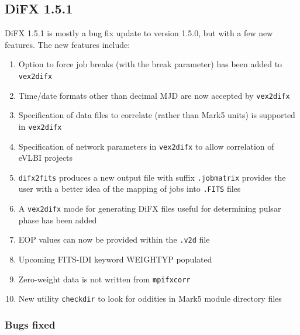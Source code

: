 \subsection{DiFX 1.5.1}

DiFX 1.5.1 is mostly a bug fix update to version 1.5.0, but with a few new features.
The new features include:
\begin{enumerate}
\item Option to force job breaks (with the break parameter) has been added to {\tt vex2difx}
\item Time/date formats other than decimal MJD are now accepted by {\tt vex2difx}
\item Specification of data files to correlate (rather than Mark5 units) is supported in {\tt vex2difx}
\item Specification of network parameters in {\tt vex2difx} to allow correlation of eVLBI projects
\item {\tt difx2fits} produces a new output file with suffix {\tt .jobmatrix} provides the user with a better idea of the mapping of jobs into {\tt .FITS} files
\item A {\tt vex2difx} mode for generating DiFX files useful for determining pulsar phase has been added
\item EOP values can now be provided within the {\tt .v2d} file
\item Upcoming FITS-IDI keyword WEIGHTYP populated
\item Zero-weight data is not written from {\tt mpifxcorr}
\item New utility {\tt checkdir} to look for oddities in Mark5 module directory files
\end{enumerate}

\subsubsection{Bugs fixed}

